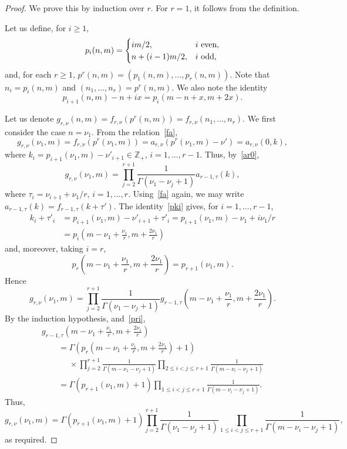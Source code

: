 \documentclass[10pt,a4paper]{amsart}
\newcommand\Z{{\mathbb Z}}
\begin{document}
\begin{proof}
We prove this by induction over $r$. For $r=1$, it follows from the definition.

Let us define, for $i\ge 1$,
\[ p_i(n,m)=\begin{cases} im/2 ,& i \mbox{ \rm even},\\ n+(i-1)m/2 ,& i \mbox{ \rm odd},\end{cases}\]
and, for each $r\ge 1$,
$p^r(n,m)=(p_1(n,m),\dots,p_r(n,m))$.
Note that $n_i=p_i(n,m)$ and $(n_1,\dots,\allowbreak n_r)=p^r(n,m)$.
We also note the identity
\begin{equation}\label{pki}
p_{i+1}(n,m)-n+ix=p_i(m-n+x,m+2x).
\end{equation}

Let us denote
$g_{r,\nu}(n,m)=f_{r,\nu}(p^r(n,m))=f_{r,\nu}(n_1,\dots,n_r)$.
We first consider the case $n=\nu_1$. From the relation~\eqref{fa},
\[g_{r,\nu}(\nu_1,m) = f_{r,\nu}(p^r(\nu_1,m)) = a_{r,\nu}(p^r(\nu_1,m)-\nu') = a_{r,\nu}(0,k),\]
where $k_i = p_{i+1}(\nu_1,m)-\nu'_{i+1} \in\Z_+$, $i=1,\dots,r-1$. Thus, by~\eqref{ar0},
\[g_{r,\nu}(\nu_1,m) = \prod_{j=2}^{r+1} \frac{1}{\Gamma(\nu_1-\nu_j+1)} a_{r-1,\tau}(k),\]
where $\tau_i=\nu_{i+1}+\nu_1/r$, $i=1,\dots,r$. Using~\eqref{fa} again, we may write
$a_{r-1,\tau}(k) = f_{r-1,\tau}(k+\tau')$.
The identity~\eqref{pki} gives, for $i=1,\dots,r-1$,
\begin{align*}
 k_i+\tau'_i &= p_{i+1}(\nu_1,m)-\nu'_{i+1} +\tau'_i = p_{i+1}(\nu_1,m) - \nu_1 + i\nu_1/r \\
&= p_i\left(m-\nu_1+\frac{\nu_1}{r},m+\frac{2\nu_1}{r}\right)
\end{align*}
and, moreover, taking $i=r$,
\begin{equation}\label{pri} p_{r}\left(m-\nu_1+\frac{\nu_1}{r},m+\frac{2\nu_1}{r}\right) = p_{r+1}(\nu_1,m).\end{equation}
Hence
\[g_{r,\nu}(\nu_1,m) = \prod_{j=2}^{r+1} \frac{1}{\Gamma(\nu_1-\nu_j+1)} g_{r-1,\tau}\left(m-\nu_1+\frac{\nu_1}{r},m+\frac{2\nu_1}{r}\right).\]
By the induction hypothesis, and~\eqref{pri},
\begin{gather*}
 g_{r-1,\tau}\left(m-\nu_1+\frac{\nu_1}{r},m+\frac{2\nu_1}{r}\right)\\
\qquad= \Gamma\left(p_{r}\left(m-\nu_1+\frac{\nu_1}{r},m+\frac{2\nu_1}{r}\right)+1\right)\\
\phantom{\qquad= }{}\times
 \prod_{j=2}^{r+1} \frac1{\Gamma(m-\nu_1-\nu_j+1) }\prod_{2\le i<j\le r+1} \frac1{\Gamma(m-\nu_i-\nu_j+1)} \\
\qquad= \Gamma\left(p_{r+1}(\nu_1,m)+1\right) \prod_{1\le i<j\le r+1} \frac1{\Gamma(m-\nu_i-\nu_j+1)}.
\end{gather*}
Thus,
\[g_{r,\nu}(\nu_1,m) = \Gamma\left(p_{r+1}(\nu_1,m)+1\right) \prod_{j=2}^{r+1} \frac{1}{\Gamma(\nu_1-\nu_j+1)} \prod_{1\le i<j\le r+1} \frac1{\Gamma(m-\nu_i-\nu_j+1)},\]
as required.


\end{proof}
\end{document}
